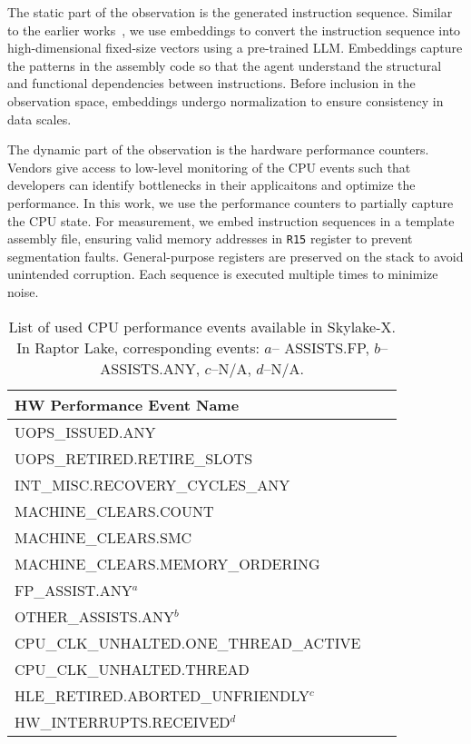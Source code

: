 The static part of the observation is the generated instruction sequence. Similar to the earlier works~\cite{tol2021fastspec,mankowitz2023alphadev}, we use embeddings to convert the instruction sequence into high-dimensional fixed-size vectors using a pre-trained LLM. Embeddings capture the patterns in the assembly code so that the agent understand the structural and functional dependencies between instructions. Before inclusion in the observation space, embeddings undergo normalization to ensure consistency in data scales. 

The dynamic part of the observation is the hardware performance counters. Vendors give access to low-level monitoring of the CPU events such that developers can identify bottlenecks in their applicaitons and optimize the performance. In this work, we use the performance counters to partially capture the CPU state. For  measurement, we embed instruction sequences in a template assembly file, ensuring valid memory addresses in \texttt{R15} register to prevent segmentation faults. General-purpose registers are preserved on the stack to avoid unintended corruption. Each sequence is executed multiple times to minimize noise.

\begin{table}[h!]
    \centering
    \footnotesize
    \begin{tabular}{lll}
    \toprule
    \textbf{HW Performance Event Name} \\
    \midrule
    UOPS\_ISSUED.ANY  \\
    UOPS\_RETIRED.RETIRE\_SLOTS \\
    INT\_MISC.RECOVERY\_CYCLES\_ANY  \\
    MACHINE\_CLEARS.COUNT \\
    MACHINE\_CLEARS.SMC \\
    MACHINE\_CLEARS.MEMORY\_ORDERING \\
    FP\_ASSIST.ANY$^a$ \\
    OTHER\_ASSISTS.ANY$^b$ \\
    CPU\_CLK\_UNHALTED.ONE\_THREAD\_ACTIVE \\
    CPU\_CLK\_UNHALTED.THREAD \\
    HLE\_RETIRED.ABORTED\_UNFRIENDLY$^c$ \\
    HW\_INTERRUPTS.RECEIVED$^d$ \\
    \bottomrule
    \end{tabular}
    \caption{List of used CPU performance events available in Skylake-X. In Raptor Lake, corresponding events: $a$-- ASSISTS.FP, $b$--ASSISTS.ANY, $c$--N/A, $d$--N/A.}\label{tab:cpu_events}
\end{table}

